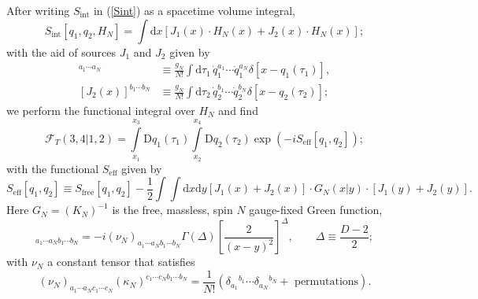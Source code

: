 After writing $S_{\text{int}}$ in (\ref{Sint}) as a spacetime volume integral,
\begin{equation}
	S_{\text{int}}[ q_{1}, q_{2}, H_{N} ] = \int \mathrm{d}x \left[ J_{1}(x) \cdot H_{N}(x) + J_{2}(x) \cdot H_{N}(x) \right];
\end{equation}
with the aid of sources $J_{1}$ and $J_{2}$ given by
\begin{align}
	[J_{1}(x)]^{a_{1} \cdots a_{N}} &\equiv \frac{g_{N}}{N!} \int \mathrm{d} \tau_{1} \, \dot{q}_{1}^{a_{1}} \cdots \dot{q}_{1}^{a_{N}} \delta[x - q_{1}(\tau_{1})], \\
	[J_{2}(x)]^{b_{1} \cdots b_{N}} &\equiv \frac{g_{N}}{N!} \int \mathrm{d} \tau_{2} \, \dot{q}_{2}^{b_{1}} \cdots \dot{q}_{2}^{b_{N}} \delta[x - q_{2}(\tau_{2})];
\end{align}
we perform the functional integral over $H_{N}$ and find
\begin{equation}
	\mathcal{F}_{T}(3, 4|1, 2) = \int\limits_{x_{1}}^{x_{3}} \mathrm{D}q_{1}(\tau_{1}) \int\limits_{x_{2}}^{x_{4}} \mathrm{D}q_{2}(\tau_{2}) \exp{\left( - i S_{\text{eff}}\left[ q_{1}, q_{2}\right] \right)};
	\label{FSeff}
\end{equation}
with the functional $S_{\text{eff}}$ given by
\begin{equation}
	S_{\text{eff}}\left[ q_{1}, q_{2}\right] \equiv S_{\text{free}}\left[ q_{1}, q_{2}\right] - \frac{1}{2} \int \int \mathrm{d}x \mathrm{d}y \left[ J_{1}(x) + J_{2}(x) \right] \cdot G_{N}(x|y) \cdot \left[ J_{1}(y) + J_{2}(y) \right].
	\label{Seff}
\end{equation}
Here $G_{N} = (K_{N})^{-1}$ is the free, massless, spin $N$ gauge-fixed Green function,
\begin{equation}
	[G_{N}(x|y)]_{a_{1} \cdots a_{N} b_{1} \cdots b_{N}} = -i (\nu_{N})_{a_{1} \cdots a_{N} b_{1} \cdots b_{N}} \Gamma\left( \Delta \right) \left[ \frac{2}{(x - y)^{2}} \right]^{\Delta}, \qquad \Delta \equiv \frac{D - 2}{2};
	\label{GN}
\end{equation}
with $\nu_{N}$ a constant tensor that satisfies
\begin{equation}
	(\nu_{N})_{a_{1} \cdots a_{N} c_{1} \cdots c_{N}} (\kappa_{N})^{c_{1} \cdots c_{N} b_{1} \cdots b_{N}} = \frac{1}{N!} \left( \delta_{a_{1}}{}^{b_{1}} \cdots \delta_{a_{N}}{}^{b_{N}} + \text{ permutations} \right).
\end{equation}

